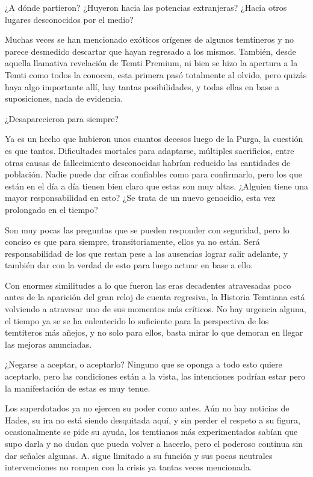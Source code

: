 \documentclass[
]{book}
\begin{document}
¿A dónde partieron? ¿Huyeron hacia las potencias extranjeras? ¿Hacia otros lugares desconocidos por el medio?

Muchas veces se han mencionado exóticos orígenes de algunos temtineros y no parece desmedido descartar que hayan regresado a los mismos. También, desde aquella llamativa revelación de Temti Premium, ni bien se hizo la apertura a la Temti como todos la conocen, esta primera pasó totalmente al olvido, pero quizás haya algo importante allí, hay tantas posibilidades, y todas ellas en base a suposiciones, nada de evidencia.

¿Desaparecieron para siempre?

Ya es un hecho que hubieron unos cuantos decesos luego de la Purga, la cuestión es que tantos. Dificultades mortales para adaptarse, múltiples sacrificios, entre otras causas de fallecimiento desconocidas habrían reducido las cantidades de población. Nadie puede dar cifras confiables como para confirmarlo, pero los que están en el día a día tienen bien claro que estas son muy altas. ¿Alguien tiene una mayor responsabilidad en esto? ¿Se trata de un nuevo genocidio, esta vez prolongado en el tiempo?

Son muy pocas las preguntas que se pueden responder con seguridad, pero lo conciso es que para siempre, transitoriamente, ellos ya no están. Será responsabilidad de los que restan pese a las ausencias lograr salir adelante, y también dar con la verdad de esto para luego actuar en base a ello.

Con enormes similitudes a lo que fueron las eras decadentes atravesadas poco antes de la aparición del gran reloj de cuenta regresiva, la Historia Temtiana está volviendo a atravesar uno de sus momentos más críticos. No hay urgencia alguna, el tiempo ya se se ha enlentecido lo suficiente para la perspectiva de los temtiteros más añejos, y no solo para ellos, basta mirar lo que demoran en llegar las mejoras anunciadas.

¿Negarse a aceptar, o aceptarlo? Ninguno que se oponga a todo esto quiere aceptarlo, pero las condiciones están a la vista, las intenciones podrían estar pero la manifestación de estas es muy tenue.

Los superdotados ya no ejercen su poder como antes. Aún no hay noticias de Hades, su ira no está siendo desquitada aquí, y sin perder el respeto a su figura, ocasionalmente se pide su ayuda, los temtianos más experimentados sabían que supo darla y no dudan que pueda volver a hacerlo, pero el poderoso continua sin dar señales algunas. A. sigue limitado a su función y sus pocas neutrales intervenciones no rompen con la crisis ya tantas veces mencionada.
\end{document}
